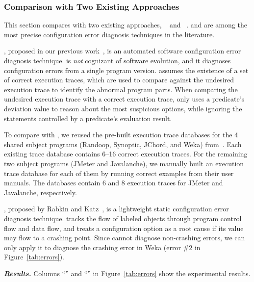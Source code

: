 \subsubsection{Comparison with Two Existing Approaches}
\label{sec:existing}

This section compares \ourtool with two existing approaches,
\prevtool~\cite{Zhang:2013:ADS} and \conftool~\cite{Rabkin:2011:PPC}.
\prevtool and \conftool are among the most
precise configuration error diagnosis techniques in the literature.


\noindent\textbf{\prevtoolnoxspace}, proposed in our previous work~\cite{Zhang:2013:ADS},
is an automated
software configuration error diagnosis technique. %
\prevtool is \textit{not} cognizant of
software evolution, and it diagnoses configuration errors from
a single program version.
\prevtool assumes the existence of a set of correct execution
traces, which are used to compare against the undesired
execution trace to identify the abnormal program parts.
When comparing the undesired execution trace with a
correct execution trace, \prevtool only uses a predicate's deviation
value to reason about the most suspicious options, while
ignoring the statements controlled by a predicate's evaluation result. 

To compare \ourtool with \prevtool, 
we reused the pre-built execution trace databases
for the 4 shared subject programs (Randoop, Synoptic, JChord, and Weka)
from~\cite{Zhang:2013:ADS}.
Each existing trace database contains 6--16 correct
execution traces.
For the remaining two subject programs (JMeter and
Javalanche), we manually built an execution trace database
for each of them by running correct examples from their user manuals.
The databases contain 6 and 8
execution traces for JMeter and Javalanche, respectively.

\vspace{1mm}

\noindent \textbf{\conftoolnoxspace}, proposed by Rabkin and
Katz~\cite{Rabkin:2011:PPC}, is a lightweight
static configuration error diagnosis technique.
\conftool tracks the flow of labeled objects through 
program control flow and data flow, and treats a configuration option
as a root cause if its value may flow to a crashing point.
Since \conftool cannot diagnose non-crashing errors, we
can only apply it to diagnose the crashing error in
Weka (error \#2 in Figure~\ref{tab:errors}).


\vspace{1mm}
\noindent \textbf{\textit{Results.}}
Columns ``\prevtool'' and ``\conftool'' in Figure~\ref{tab:errors} show
the experimental results.

